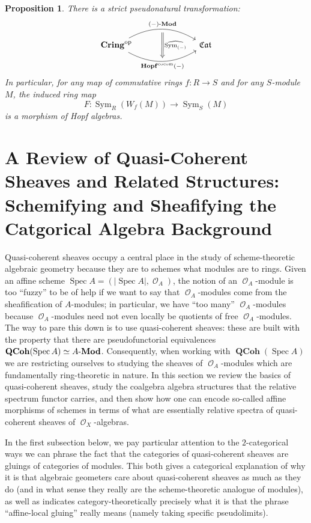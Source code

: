 \documentclass{amsart}
\newtheorem{proposition}[equation]{Proposition}
\theoremstyle{definition}
\DeclareMathOperator{\Ocal}{\mathcal{O}}
\DeclareMathOperator{\sym}{Sym}
\DeclareMathOperator{\Cring}{\mathbf{Cring}}
\DeclareMathOperator{\fCat}{\mathfrak{Cat}}
\DeclareMathOperator{\op}{op}
\DeclareMathOperator{\Spec}{Spec}
\newcommand{\Sym}[1]{\sym_{#1}}
\DeclareMathOperator{\QCoh}{\mathbf{QCoh}}
\newcommand{\Mod}[1]{{#1}\textnormal{-}\mathbf{Mod}}
\numberwithin{equation}{subsection}
\begin{document}
\begin{proposition}\label{Prop: Section Background Alg: Strictness of Hopf for Restriction of Scalars}
There is a strict pseudonatural transformation:
\[
\begin{tikzcd}
\Cring^{\op} \ar[rrr, bend left = 30, ""{name = U}]{}{\Mod{(-)}} \ar[rrr, bend right = 30, swap, ""{name = D}]{}{\mathbf{Hopf}^{\operatorname{cocom}}(-)} & & & \fCat
\ar[from = U, to = D, Rightarrow, shorten <= 4pt, shorten >= 4pt]{}{\widehat{\Sym{(-)}}}
\end{tikzcd}
\]
In particular, for any map of commutative rings $f:R \to S$ and for any $S$-module $M$, the induced ring map
\[
F:\Sym{R}(W_f(M)) \to \Sym{S}(M)
\]
is a morphism of Hopf algebras.
\end{proposition}

\section{A Review of Quasi-Coherent Sheaves and Related Structures: Schemifying and Sheafifying the Catgorical Algebra Background}\label{Section: QCoh}

Quasi-coherent sheaves occupy a central place in the study of scheme-theoretic algebraic geometry because they are to schemes what modules are to rings. Given an affine scheme $\Spec A = (\lvert \Spec A\rvert, \Ocal_A)$, the notion of an $\Ocal_A$-module is too ``fuzzy'' to be of help if we want to say that $\Ocal_A$-modules come from the sheafification of $A$-modules; in particular, we have ``too many'' $\Ocal_{A}$-modules because $\Ocal_{A}$-modules need not even locally be quotients of free $\Ocal_{A}$-modules. The way to pare this down is to use quasi-coherent sheaves: these are built with the property that there are pseudofunctorial equivalences $\QCoh(\Spec A) \simeq \Mod{A}$. Consequently, when working with $\QCoh(\Spec A)$ we are restricting ourselves to studying the sheaves of $\Ocal_A$-modules which are fundamentally ring-theoretic in nature. In this section we review the basics of quasi-coherent sheaves, study the coalgebra algebra structures that the relative spectrum functor carries, and then show how one can encode so-called affine morphisms of schemes in terms of what are essentially relative spectra of quasi-coherent sheaves of $\Ocal_X$-algebras.

In the first subsection below, we pay particular attention to the $2$-categorical ways we can phrase the fact that the categories of quasi-coherent sheaves are gluings of categories of modules. This both gives a categorical explanation of why it is that algebraic geometers care about quasi-coherent sheaves as much as they do (and in what sense they really are the scheme-theoretic analogue of modules), as well as indicates category-theoretically precisely what it is that the phrase ``affine-local gluing'' really means (namely taking specific pseudolimits).
\end{document}
